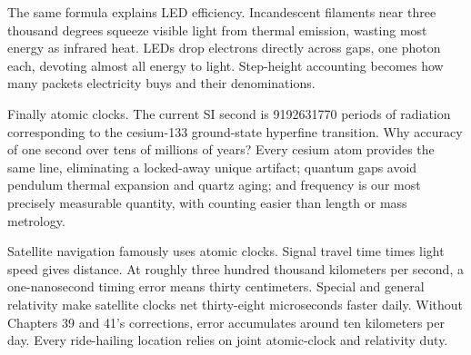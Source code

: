 \begin{mainline}
The same formula explains LED efficiency. Incandescent filaments near three thousand degrees squeeze visible light from thermal emission, wasting most energy as infrared heat. LEDs drop electrons directly across gaps, one photon each, devoting almost all energy to light. Step-height accounting becomes how many packets electricity buys and their denominations.

Finally atomic clocks. The current SI second is 9192631770 periods of radiation corresponding to the cesium-133 ground-state hyperfine transition. Why accuracy of one second over tens of millions of years? Every cesium atom provides the same line, eliminating a locked-away unique artifact; quantum gaps avoid pendulum thermal expansion and quartz aging; and frequency is our most precisely measurable quantity, with counting easier than length or mass metrology.

Satellite navigation famously uses atomic clocks. Signal travel time times light speed gives distance. At roughly three hundred thousand kilometers per second, a one-nanosecond timing error means thirty centimeters. Special and general relativity make satellite clocks net thirty-eight microseconds faster daily. Without Chapters 39 and 41's corrections, error accumulates around ten kilometers per day. Every ride-hailing location relies on joint atomic-clock and relativity duty.
\end{mainline}


